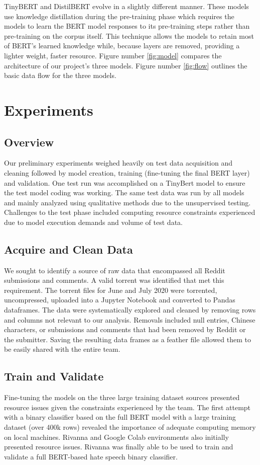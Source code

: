 \documentclass[conference]{IEEEtran}
\begin{document}
TinyBERT and DistilBERT evolve in a slightly different manner. These models use knowledge distillation during the pre-training phase which requires the models to learn the BERT model responses to its pre-training steps rather than pre-training on the corpus itself. This technique allows the models to retain most of BERT's learned knowledge while, because layers are removed, providing a lighter weight, faster resource\cite{b16}. Figure number \ref{fig:model} compares the architecture of our project's three models. Figure number \ref{fig:flow} outlines the basic data flow for the three models.

\section{Experiments}
\subsection{Overview}
Our preliminary experiments weighed heavily on test data acquisition and cleaning followed by model creation, training (fine-tuning the final BERT layer) and validation. One test run was accomplished on a TinyBert model to ensure the test model coding was working. The same test data was run by all models and mainly analyzed using qualitative methods due to the unsupervised testing. Challenges to the test phase included computing resource constraints experienced due to model execution demands and volume of test data. 

\subsection{Acquire and Clean Data}
We sought to identify a source of raw data that encompassed all Reddit submissions and comments. A valid torrent was identified that met this requirement. The torrent files\cite{b17} for June and July 2020 were torrented, uncompressed, uploaded into a Jupyter Notebook and converted to Pandas dataframes. The data were systematically explored and cleaned by removing rows and columns not relevant to our analysis. Removals included null entries, Chinese characters, or submissions and comments that had been removed by Reddit or the submitter. Saving the resulting data frames as a feather file allowed them to be easily shared with the entire team. 

\subsection{Train and Validate}
 Fine-tuning the models on the three large training dataset sources presented resource issues given the constraints experienced by the team. The first attempt with a binary classifier based on the full BERT model with a large training dataset (over 400k rows) revealed the importance of adequate computing memory on local machines. Rivanna and Google Colab environments also initially presented resource issues. Rivanna was finally able to be used to train and validate a full BERT-based hate speech binary classifier.
 
\end{document}

